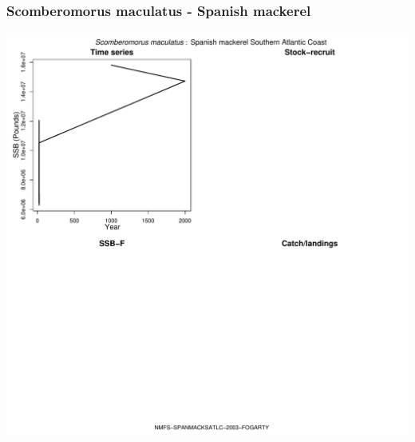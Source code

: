 \subsubsection{Scomberomorus maculatus - Spanish mackerel}
\begin{center}
\includegraphics[width=1.2\textwidth]{../R/figures/NMFS-SPANMACKSATLC-2003-FOGARTY.pdf}
\end{center}

